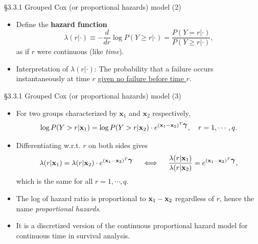\documentclass{beamer}
\newenvironment{wideitemize}%
  {\begin{itemize}%
    \setlength{\parskip}{1em}}%
  {\end{itemize}}
\begin{document}
\begin{frame} {\S3.3.1 Grouped Cox (or proportional hazards) model (2)}
\begin{wideitemize}
\item  Define the \textbf{hazard function} \[
\lambda(r|\cdot)\equiv -\frac{d}{dr}\log P(Y\geq r|\cdot) = \frac{P(Y = r| \cdot)}{P(Y \geq r| \cdot)},
\]
as if $r$ were continuous (like \emph{time}). 
\item Interpretation of  $\lambda(r|\cdot)$: 
The probability that a failure occurs instantaneously at time $r$ \underline{given no failure before time $r$}.


\end{wideitemize}
\end{frame}


\begin{frame} {\S3.3.1 Grouped Cox (or proportional hazards) model (3)}
\begin{wideitemize}
\item
For two groups characterized by $\textbf{x}_1$ and $\textbf{x}_2$ respectively,
\[
\log P(Y> r|\textbf{x}_1)=\log P(Y> r|\textbf{x}_2)\cdot
e^{(\textbf{x}_1-\textbf{x}_2)^T\mbox{\boldmath $\gamma$}}, \quad r=1,\cdots, q.
\]




\item Differentiating w.r.t. $r$ on both sides  gives
$$\lambda(r|\textbf{x}_1)=\lambda(r|\textbf{x}_2)\cdot
e^{(\textbf{x}_1-\textbf{x}_2)^T\mbox{\boldmath $\gamma$}} \quad \iff \quad
\frac{\lambda(r|\textbf{x}_1)}{\lambda(r|\textbf{x}_2)}=
e^{(\textbf{x}_1-\textbf{x}_2)^T\mbox{\boldmath $\gamma$}},$$
which is the same for all $r=1,\cdots,q$. 

\item The log of hazard ratio is proportional to ${\bf x}_1 - {\bf x}_2$ regardless of $r$, hence the name \emph{proportional hazards}.


\item  It is a discretized version of the continuous proportional hazard model for continuous time in survival analysis. 
\end{wideitemize}

\end{frame}
\end{document}
